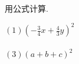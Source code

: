 \begin{comment}
\item {
    计算 $(-x-y)^2$.
    \ifshowSolution
    \fangsong\zihao{4}
    \\
    思路: 先将括号里的负号处理掉, 再用公式.

    解答: 
    \begin{align*}
        \mbox{原式} &= (x+y)^2\\
        &= x^2 +2xy + y^2
    \end{align*}
    \else
        \\ \\ \\
    \fi
}
\end{comment}

\begin{comment}
\item {
    判断下列各式的正误.

    \textcircled{1}$(a-b)^2 = a^2 - b^2$\\
    \textcircled{2}$(-2a-3b)^2 = 4a^2 - 12ab +9b^2$\\
    \textcircled{3}$(\frac13 m + \frac12 n)^2 = \frac19 m^2 + \frac16 mn + \frac14 n^2$\\
    \textcircled{4}$(-y-3)^2 = y^2 + 6y + 9$
    \\ \\ \\
}
\end{comment}

\item {
    用公式计算.

    $(1) (-\frac34 x + \frac43 y)^2$ \\ \\

    
    $(3) (a+b+c)^2$ \\ \\
    \\ \\
}


